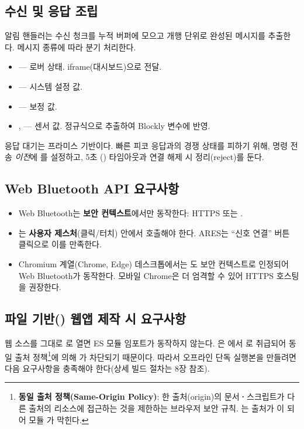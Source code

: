 \subsection{수신 및 응답 조립}

알림 핸들러는 수신 청크를 누적 버퍼에 모으고 개행 단위로 완성된 메시지를
추출한다. 메시지 종류에 따라 분기 처리한다.

\begin{itemize}
  \item {} --- 로버 상태. iframe(대시보드)으로  전달.
  \item {} --- 시스템 설정 값.
  \item {} --- 보정 값.
  \item {},  --- 센서 값. 정규식으로 추출하여 Blockly 변수에 반영.
\end{itemize}

응답 대기는 프라미스 기반이다. 빠른 피코 응답과의 경쟁 상태를 피하기 위해,
명령 전송 \emph{이전}에 를 설정하고, 5초
() 타임아웃과 연결 해제 시 정리(reject)를 둔다.

\subsection{Web Bluetooth API 요구사항}

\begin{infobox}[title=보안 컨텍스트 및 사용자 제스처]
\begin{itemize}
  \item Web Bluetooth는 \textbf{보안 컨텍스트}에서만 동작한다: HTTPS 또는
        .
  \item {}는 \textbf{사용자 제스처}(클릭/터치) 안에서 호출해야
        한다. ARES는 ``신호 연결'' 버튼 클릭으로 이를 만족한다.
  \item Chromium 계열(Chrome, Edge) 데스크톱에서는 도 보안
        컨텍스트로 인정되어 Web Bluetooth가 동작한다. 모바일 Chrome은 더
        엄격할 수 있어 HTTPS 호스팅을 권장한다.
\end{itemize}
\end{infobox}

\subsection{파일 기반() 웹앱 제작 시 요구사항}

웹 소스를 그대로 로 열면 ES 모듈 임포트가 동작하지 않는다.
은 에서 로 취급되어
동일 출처 정책\footnote{\textbf{동일 출처 정책(Same-Origin Policy)}: 한 출처(origin)의
문서\textbf{·}스크립트가 다른 출처의 리소스에 접근하는 것을 제한하는 브라우저 보안 규칙.
는 출처가 이 되어 모듈 가 막힌다.}에 의해 가 차단되기 때문이다. 따라서 오프라인 단독
실행본을 만들려면 다음 요구사항을 충족해야 한다(상세 빌드 절차는 8장 참조).

